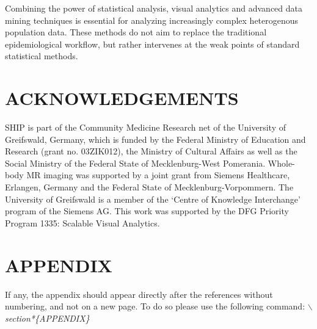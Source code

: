 \documentclass[a4paper,twoside]{style/article}
\begin{document}
Combining the power of statistical analysis, visual analytics and advanced data mining techniques is essential for analyzing increasingly complex heterogenous population data.
These methods do not aim to replace the traditional epidemiological workflow, but rather intervenes at the weak points of standard statistical methods.

\section*{\uppercase{Acknowledgements}}

\noindent SHIP is part of the Community Medicine Research net of the University of Greifswald, Germany, which is funded by the Federal Ministry of Education and Research (grant no. 03ZIK012), the Ministry of Cultural Affairs as well as the Social Ministry of the Federal State of Mecklenburg-West Pomerania. Whole-body MR imaging was supported by a joint grant from Siemens Healthcare, Erlangen, Germany and the Federal State of Mecklenburg-Vorpommern. The University of Greifswald is a member of the ‘Centre of Knowledge Interchange’ program of the Siemens AG. This work was supported by the DFG Priority Program 1335: Scalable Visual Analytics.


\vfill

{\small
}


\section*{\uppercase{Appendix}}

\noindent If any, the appendix should appear directly after the
references without numbering, and not on a new page. To do so please use the following command:
\textit{$\backslash$section*\{APPENDIX\}}

\vfill
\end{document}
